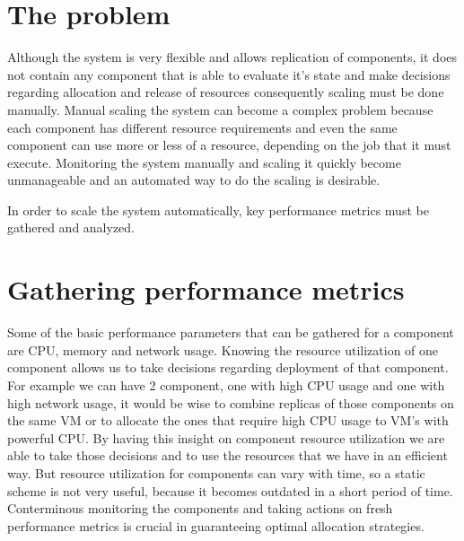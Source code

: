 \documentclass[fleqn,10pt]{./class/wlscirep}
\begin{document}
\section{The problem}
Although the system is very flexible and allows replication of components, it does not contain any component that is able to evaluate it's state and make decisions regarding allocation and release of resources consequently scaling must be done manually. Manual scaling the system can become a complex problem because each component has different resource requirements and even the same component can use more or less of a resource, depending on the job that it must execute. Monitoring the system manually and scaling it quickly become unmanageable and an automated way to do the scaling is desirable. 

In order to scale the system automatically, key performance metrics must be gathered and analyzed. 

\section{Gathering performance metrics}
Some of the basic performance parameters that can be gathered for a component are CPU, memory and network usage. Knowing the resource utilization of one component allows us to take decisions regarding deployment of that component. For example we can have 2 component, one with high CPU usage and one with high network usage, it would be wise to combine replicas of those components on the same VM or to allocate the ones that require high CPU usage to VM's with powerful CPU. By having this insight on component resource utilization we are able to take those decisions and to use the resources that we have in an efficient way. But resource utilization for components can vary with time, so a static scheme is not very useful, because it becomes outdated in a short period of time. Conterminous monitoring the components and taking actions on fresh performance metrics is crucial in guaranteeing optimal allocation strategies.
\end{document}
